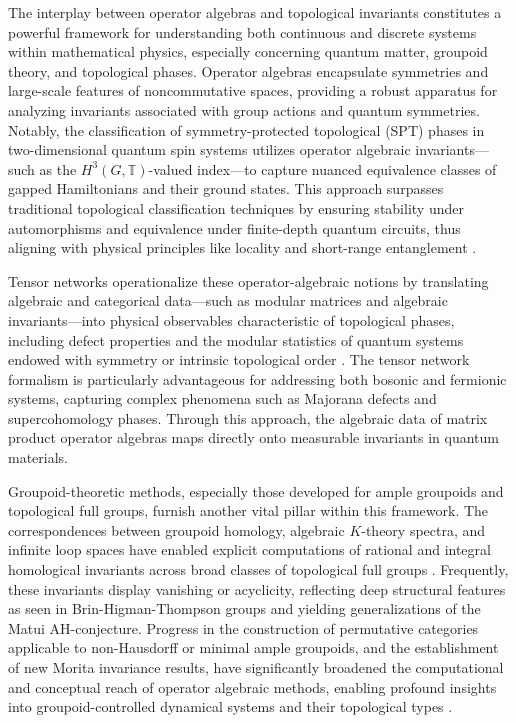 \documentclass[11pt]{article}
\begin{document}
The interplay between operator algebras and topological invariants constitutes a powerful framework for understanding both continuous and discrete systems within mathematical physics, especially concerning quantum matter, groupoid theory, and topological phases. Operator algebras encapsulate symmetries and large-scale features of noncommutative spaces, providing a robust apparatus for analyzing invariants associated with group actions and quantum symmetries. Notably, the classification of symmetry-protected topological (SPT) phases in two-dimensional quantum spin systems utilizes operator algebraic invariants—such as the $H^3(G, \mathbb{T})$-valued index—to capture nuanced equivalence classes of gapped Hamiltonians and their ground states. This approach surpasses traditional topological classification techniques by ensuring stability under automorphisms and equivalence under finite-depth quantum circuits, thus aligning with physical principles like locality and short-range entanglement \cite{ref18}.

Tensor networks operationalize these operator-algebraic notions by translating algebraic and categorical data—such as modular matrices and algebraic invariants—into physical observables characteristic of topological phases, including defect properties and the modular statistics of quantum systems endowed with symmetry or intrinsic topological order \cite{ref21}. The tensor network formalism is particularly advantageous for addressing both bosonic and fermionic systems, capturing complex phenomena such as Majorana defects and supercohomology phases. Through this approach, the algebraic data of matrix product operator algebras maps directly onto measurable invariants in quantum materials.

Groupoid-theoretic methods, especially those developed for ample groupoids and topological full groups, furnish another vital pillar within this framework. The correspondences between groupoid homology, algebraic $K$-theory spectra, and infinite loop spaces have enabled explicit computations of rational and integral homological invariants across broad classes of topological full groups \cite{ref22}. Frequently, these invariants display vanishing or acyclicity, reflecting deep structural features as seen in Brin-Higman-Thompson groups and yielding generalizations of the Matui AH-conjecture. Progress in the construction of permutative categories applicable to non-Hausdorff or minimal ample groupoids, and the establishment of new Morita invariance results, have significantly broadened the computational and conceptual reach of operator algebraic methods, enabling profound insights into groupoid-controlled dynamical systems and their topological types \cite{ref22,ref23}.
\end{document}

